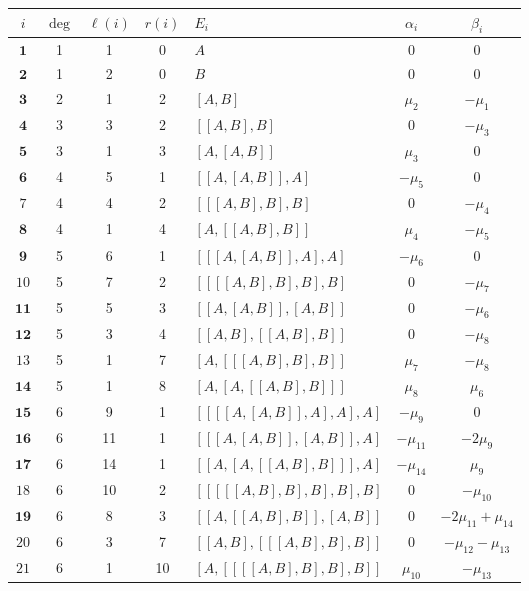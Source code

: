 \documentclass[11pt]{article}
\begin{document}
\begin{table}[ht]
\centering
\small
\renewcommand{\arraystretch}{1.1}
\begin{tabular}{cccclcc}
\hline
$i$ & $\deg$ & $\ell(i)$ & $r(i)$ & $E_i$ & $\alpha_i$ & $\beta_i$ \\
\hline\hline
$\mathbf{1}$ & 1 & 1 & 0 & $A$ & $0$ & $0$ \\
$\mathbf{2}$ & 1 & 2 & 0 & $B$ & $0$ & $0$ \\
\hline
$\mathbf{3}$ & 2 & 1 & 2 & $[A,B]$ & $\mu_{2}$ & $- \mu_{1}$ \\
\hline
$\mathbf{4}$ & 3 & 3 & 2 & $[[A,B],B]$ & $0$ & $- \mu_{3}$ \\
$\mathbf{5}$ & 3 & 1 & 3 & $[A,[A,B]]$ & $\mu_{3}$ & $0$ \\
\hline
$\mathbf{6}$ & 4 & 5 & 1 & $[[A,[A,B]],A]$ & $- \mu_{5}$ & $0$ \\
$7$ & 4 & 4 & 2 & $[[[A,B],B],B]$ & $0$ & $- \mu_{4}$ \\
$\mathbf{8}$ & 4 & 1 & 4 & $[A,[[A,B],B]]$ & $\mu_{4}$ & $- \mu_{5}$ \\
\hline
$\mathbf{9}$ & 5 & 6 & 1 & $[[[A,[A,B]],A],A]$ & $- \mu_{6}$ & $0$ \\
$10$ & 5 & 7 & 2 & $[[[[A,B],B],B],B]$ & $0$ & $- \mu_{7}$ \\
$\mathbf{11}$ & 5 & 5 & 3 & $[[A,[A,B]],[A,B]]$ & $0$ & $- \mu_{6}$ \\
$\mathbf{12}$ & 5 & 3 & 4 & $[[A,B],[[A,B],B]]$ & $0$ & $- \mu_{8}$ \\
$13$ & 5 & 1 & 7 & $[A,[[[A,B],B],B]]$ & $\mu_{7}$ & $- \mu_{8}$ \\
$\mathbf{14}$ & 5 & 1 & 8 & $[A,[A,[[A,B],B]]]$ & $\mu_{8}$ & $\mu_{6}$ \\
\hline
$\mathbf{15}$ & 6 & 9 & 1 & $[[[[A,[A,B]],A],A],A]$ & $- \mu_{9}$ & $0$ \\
$\mathbf{16}$ & 6 & 11 & 1 & $[[[A,[A,B]],[A,B]],A]$ & $- \mu_{11}$ & $- 2\mu_{9}$ \\
$\mathbf{17}$ & 6 & 14 & 1 & $[[A,[A,[[A,B],B]]],A]$ & $- \mu_{14}$ & $\mu_{9}$ \\
$18$ & 6 & 10 & 2 & $[[[[[A,B],B],B],B],B]$ & $0$ & $- \mu_{10}$ \\
$\mathbf{19}$ & 6 & 8 & 3 & $[[A,[[A,B],B]],[A,B]]$ & $0$ & $- 2\mu_{11} + \mu_{14}$ \\
$20$ & 6 & 3 & 7 & $[[A,B],[[[A,B],B],B]]$ & $0$ & $- \mu_{12} - \mu_{13}$ \\
$21$ & 6 & 1 & 10 & $[A,[[[[A,B],B],B],B]]$ & $\mu_{10}$ & $- \mu_{13}$ \\

\end{tabular}
\end{table}
\end{document}
